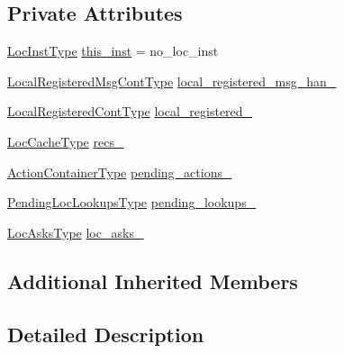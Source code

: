 \subsection*{Private Attributes}
\begin{DoxyCompactItemize}
\item 
\hyperlink{namespacevt_1_1location_a4db6456e8024af2d23fc5ae560fef866}{Loc\+Inst\+Type} \hyperlink{structvt_1_1location_1_1_entity_location_coord_ade191f7cf6aba682f960abef1ddab9fc}{this\+\_\+inst} = no\+\_\+loc\+\_\+inst
\item 
\hyperlink{structvt_1_1location_1_1_entity_location_coord_a0c6d24fed6c690ac6d044b11d884df65}{Local\+Registered\+Msg\+Cont\+Type} \hyperlink{structvt_1_1location_1_1_entity_location_coord_a48417f0a02356ec97b97250b18ba43f2}{local\+\_\+registered\+\_\+msg\+\_\+han\+\_\+}
\item 
\hyperlink{structvt_1_1location_1_1_entity_location_coord_a90aee70e2e80fe4c1abf1d0616113708}{Local\+Registered\+Cont\+Type} \hyperlink{structvt_1_1location_1_1_entity_location_coord_a17f116f6581c4f67c2c5450db40f70a6}{local\+\_\+registered\+\_\+}
\item 
\hyperlink{structvt_1_1location_1_1_entity_location_coord_a8824e120b11c3234534a6dce11fe0c69}{Loc\+Cache\+Type} \hyperlink{structvt_1_1location_1_1_entity_location_coord_a4822f7d8be8fd72319ad7a1823cf5fc9}{recs\+\_\+}
\item 
\hyperlink{structvt_1_1location_1_1_entity_location_coord_afeaaebfc1d7cbdd20cccbd348d96748a}{Action\+Container\+Type} \hyperlink{structvt_1_1location_1_1_entity_location_coord_aa62ca806fbfc08f754e7e72dd9e91a7a}{pending\+\_\+actions\+\_\+}
\item 
\hyperlink{structvt_1_1location_1_1_entity_location_coord_a495c5dfc3aa444524af9aede4b20cfdc}{Pending\+Loc\+Lookups\+Type} \hyperlink{structvt_1_1location_1_1_entity_location_coord_a321719e0c1c938ef5dc8134ac92849fd}{pending\+\_\+lookups\+\_\+}
\item 
\hyperlink{structvt_1_1location_1_1_entity_location_coord_a492ca5404229c05923f69bae396f2ac4}{Loc\+Asks\+Type} \hyperlink{structvt_1_1location_1_1_entity_location_coord_a52abbeb79fc2d24889a05ac87ad6e7f5}{loc\+\_\+asks\+\_\+}
\end{DoxyCompactItemize}
\subsection*{Additional Inherited Members}


\subsection{Detailed Description}
